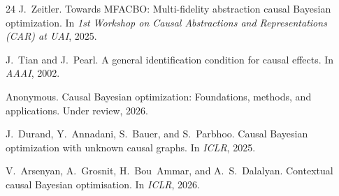 \documentclass{article}
\begin{document}
\begin{thebibliography}{24}
J.~Zeitler.
\newblock Towards {MFACBO}: Multi-fidelity abstraction causal {B}ayesian
optimization.
\newblock In \emph{1st Workshop on Causal Abstractions and Representations
(CAR) at UAI}, 2025.

J.~Tian and J.~Pearl.
\newblock A general identification condition for causal effects.
\newblock In \emph{AAAI}, 2002.

Anonymous.
\newblock Causal {B}ayesian optimization: Foundations, methods, and applications.
\newblock Under review, 2026. %

J.~Durand, Y.~Annadani, S.~Bauer, and S.~Parbhoo.
\newblock Causal {B}ayesian optimization with unknown causal graphs.
\newblock In \emph{ICLR}, 2025. %

V.~Arsenyan, A.~Grosnit, H.~Bou~Ammar, and A.~S.~Dalalyan.
\newblock Contextual causal {B}ayesian optimisation.
\newblock In \emph{ICLR}, 2026. %

\end{thebibliography}
\end{document}
